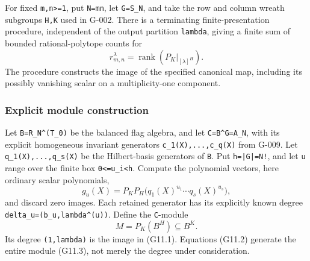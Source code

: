 \documentclass[
  10pt,
]{article}
\begin{document}
For fixed \texttt{\small m,\allowbreak{}n>=\allowbreak{}1}, put
\texttt{\small N=\allowbreak{}mn}, let
\texttt{\small G=\allowbreak{}S\_\allowbreak{}N}, and take the row and
column wreath subgroups \texttt{\small H,\allowbreak{}K} used in G-002.
There is a terminating finite-presentation procedure, independent of the
output partition \texttt{\small lambda}, giving a finite sum of bounded
rational-polytope counts for \[
r_{m,n}^{\lambda}=\operatorname{rank}(P_K|_{[\lambda]^H}).
\tag{G11.1}
\] The procedure constructs the image of the specified canonical map,
including its possibly vanishing scalar on a multiplicity-one component.

\subsubsection{Explicit module
construction}\label{explicit-module-construction}

Let
\texttt{\small B=\allowbreak{}R\_\allowbreak{}N\textasciicircum{}(\allowbreak{}T\_\allowbreak{}0)\allowbreak{}}
be the balanced flag algebra, and let
\texttt{\small C=\allowbreak{}B\textasciicircum{}G=\allowbreak{}A\_\allowbreak{}N},
with its explicit homogeneous invariant generators
\texttt{\small c\_\allowbreak{}1(\allowbreak{}X)\allowbreak{},\allowbreak{}...,\allowbreak{}c\_\allowbreak{}q(\allowbreak{}X)\allowbreak{}}
from G-009. Let
\texttt{\small q\_\allowbreak{}1(\allowbreak{}X)\allowbreak{},\allowbreak{}...,\allowbreak{}q\_\allowbreak{}s(\allowbreak{}X)\allowbreak{}}
be the Hilbert-basis generators of \texttt{\small B}. Put
\texttt{\small h=\allowbreak{}|G|=\allowbreak{}N!}, and let
\texttt{\small u} range over the finite box
\texttt{\small 0<=\allowbreak{}u\_\allowbreak{}i<h}. Compute the
polynomial vectors, here ordinary scalar polynomials, \[
g_u(X)=P_KP_H\bigl(q_1(X)^{u_1}\cdots q_s(X)^{u_s}\bigr),
\tag{G11.2}
\] and discard zero images. Each retained generator has its explicitly
known degree
\texttt{\small delta\_\allowbreak{}u=\allowbreak{}(\allowbreak{}b\_\allowbreak{}u,\allowbreak{}lambda\textasciicircum{}(\allowbreak{}u)\allowbreak{})\allowbreak{}}.
Define the \texttt{\small C}-module \[
M=P_K(B^H)\subseteq B^K.
\tag{G11.3}
\] Its degree
\texttt{\small (\allowbreak{}1,\allowbreak{}lambda)\allowbreak{}} is the
image in (G11.1). Equations (G11.2) generate the entire module (G11.3),
not merely the degree under consideration.
\end{document}
